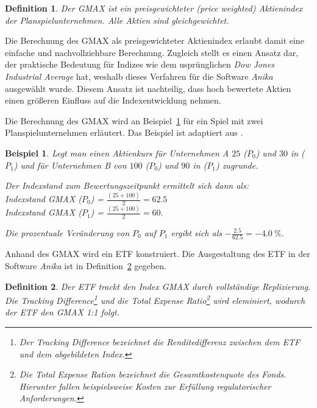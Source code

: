 \documentclass[12pt, a4paper]{article}
\theoremstyle{plain}
\newtheorem{definition}{Definition}
\newtheorem{example}{Beispiel}
\begin{document}
\begin{definition}
	\label{def:gmax}
	Der \gls{GMAX} ist ein preisgewichteter (\textit{price weighted}) Aktienindex der Planspielunternehmen. Alle Aktien sind gleichgewichtet.
\end{definition}

Die Berechnung des \gls{GMAX} als preisgewichteter Aktienindex erlaubt damit eine einfache und nachvollziehbare Berechnung. Zugleich stellt es einen Ansatz dar, der praktische Bedeutung für Indizes wie dem usprünglichen \textit{Dow Jones Industrial Average} hat, weshalb dieses Verfahren für die Software \textit{Anika} ausgewählt wurde. Diesem Ansatz ist nachteilig, dass hoch bewertete Aktien einen größeren Einfluss auf die Indexentwicklung nehmen.

Die Berechnung des \gls{GMAX} wird an Beispiel~\ref{ex:gmax} für ein Spiel mit zwei Planspielunternehmen erläutert.
Das Beispiel ist adaptiert aus \textcite[][S.~44]{bodie_investments_2018}.
\begin{example}
\label{ex:gmax}
Legt man einen Aktienkurs für Unternehmen A $25$ ($P_0$) und $30$ in ($P_1$) und für Unternehmen B von $100$ ($P_0$) und $90$ in ($P_1$) zugrunde.

Der Indexstand zum Bewertungszeitpunkt ermittelt sich dann als:\\
Indexstand \gls{GMAX} ($P_0$) = $\frac{(25 + 100)}{2} = 62.5$\\
Indexstand \gls{GMAX} ($P_1$) = $\frac{(25 + 100)}{2} = 60.$

Die prozentuale Veränderung von $P_0$ auf $P_1$ ergibt sich als $-\frac{2.5}{62.5} = -4.0~\%$.
\end{example}

 Anhand des \gls{GMAX} wird ein \gls{ETF} konstruiert. Die Ausgestaltung des \gls{ETF} in der Software \textit{Anika} ist in Definition~\ref{def:etf} gegeben.
\begin{definition}
	\label{def:etf}
	Der \gls{ETF} trackt den Index \gls{GMAX} durch vollständige Replizierung. Die \textit{Tracking Difference}\footnote{Der \textit{Tracking Difference} bezeichnet die Renditedifferenz zwischen dem \gls{ETF} und dem abgebildeten Index.} und die \textit{Total Expense Ratio}\footnote{Die \textit{Total Expense Ration} bezeichnet die Gesamtkostenquote des Fonds. Hierunter fallen beispielsweise Kosten zur Erfüllung regulatorischer Anforderungen.} wird eleminiert, wodurch der \gls{ETF} den \gls{GMAX} 1:1 folgt.
\end{definition}
\end{document}
